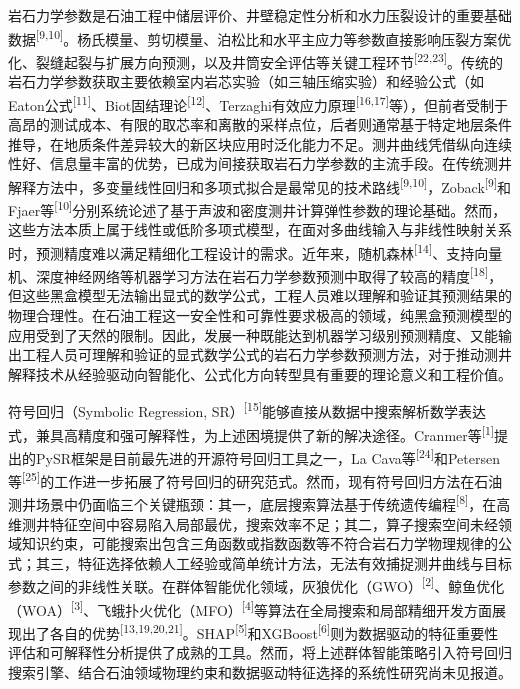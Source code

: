\documentclass[a4paper,12pt]{ctexart}
\begin{document}
岩石力学参数是石油工程中储层评价、井壁稳定性分析和水力压裂设计的重要基础数据\textsuperscript{[9,10]}。杨氏模量、剪切模量、泊松比和水平主应力等参数直接影响压裂方案优化、裂缝起裂与扩展方向预测，以及井筒安全评估等关键工程环节\textsuperscript{[22,23]}。传统的岩石力学参数获取主要依赖室内岩芯实验（如三轴压缩实验）和经验公式（如Eaton公式\textsuperscript{[11]}、Biot固结理论\textsuperscript{[12]}、Terzaghi有效应力原理\textsuperscript{[16,17]}等），但前者受制于高昂的测试成本、有限的取芯率和离散的采样点位，后者则通常基于特定地层条件推导，在地质条件差异较大的新区块应用时泛化能力不足。测井曲线凭借纵向连续性好、信息量丰富的优势，已成为间接获取岩石力学参数的主流手段。在传统测井解释方法中，多变量线性回归和多项式拟合是最常见的技术路线\textsuperscript{[9,10]}，Zoback\textsuperscript{[9]}和Fjaer等\textsuperscript{[10]}分别系统论述了基于声波和密度测井计算弹性参数的理论基础。然而，这些方法本质上属于线性或低阶多项式模型，在面对多曲线输入与非线性映射关系时，预测精度难以满足精细化工程设计的需求。近年来，随机森林\textsuperscript{[14]}、支持向量机、深度神经网络等机器学习方法在岩石力学参数预测中取得了较高的精度\textsuperscript{[18]}，但这些黑盒模型无法输出显式的数学公式，工程人员难以理解和验证其预测结果的物理合理性。在石油工程这一安全性和可靠性要求极高的领域，纯黑盒预测模型的应用受到了天然的限制。因此，发展一种既能达到机器学习级别预测精度、又能输出工程人员可理解和验证的显式数学公式的岩石力学参数预测方法，对于推动测井解释技术从经验驱动向智能化、公式化方向转型具有重要的理论意义和工程价值。

符号回归（Symbolic Regression, SR）\textsuperscript{[15]}能够直接从数据中搜索解析数学表达式，兼具高精度和强可解释性，为上述困境提供了新的解决途径。Cranmer等\textsuperscript{[1]}提出的PySR框架是目前最先进的开源符号回归工具之一，La Cava等\textsuperscript{[24]}和Petersen等\textsuperscript{[25]}的工作进一步拓展了符号回归的研究范式。然而，现有符号回归方法在石油测井场景中仍面临三个关键瓶颈：其一，底层搜索算法基于传统遗传编程\textsuperscript{[8]}，在高维测井特征空间中容易陷入局部最优，搜索效率不足；其二，算子搜索空间未经领域知识约束，可能搜索出包含三角函数或指数函数等不符合岩石力学物理规律的公式；其三，特征选择依赖人工经验或简单统计方法，无法有效捕捉测井曲线与目标参数之间的非线性关联。在群体智能优化领域，灰狼优化（GWO）\textsuperscript{[2]}、鲸鱼优化（WOA）\textsuperscript{[3]}、飞蛾扑火优化（MFO）\textsuperscript{[4]}等算法在全局搜索和局部精细开发方面展现出了各自的优势\textsuperscript{[13,19,20,21]}。SHAP\textsuperscript{[5]}和XGBoost\textsuperscript{[6]}则为数据驱动的特征重要性评估和可解释性分析提供了成熟的工具。然而，将上述群体智能策略引入符号回归搜索引擎、结合石油领域物理约束和数据驱动特征选择的系统性研究尚未见报道。
\end{document}
